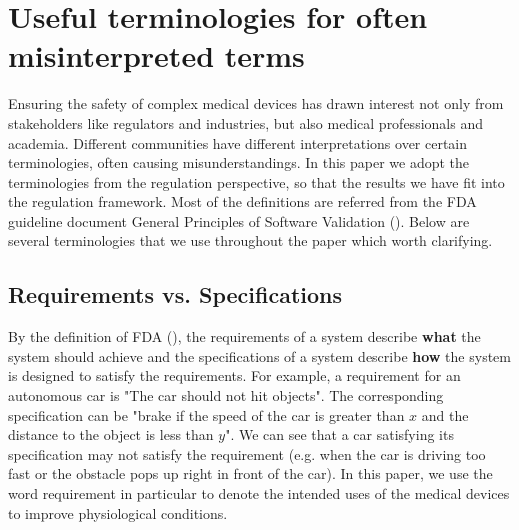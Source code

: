 \vspace{-10pt}
\section{Useful terminologies for often misinterpreted terms}
Ensuring the safety of complex medical devices has drawn interest not only from stakeholders like regulators and industries, but also medical professionals and academia. Different communities have different interpretations over certain terminologies, often causing misunderstandings. In this paper we adopt the terminologies from the regulation perspective, so that the results we have fit into the regulation framework. Most of the definitions are referred from the FDA guideline document General Principles of Software Validation (\cite{fda2}). Below are several terminologies that we use throughout the paper which worth clarifying.
\vspace{-5pt}
\subsection{Requirements vs. Specifications}
By the definition of FDA (\cite{fda3}), the requirements of a system describe \textbf{what} the system should achieve and the specifications of a system describe \textbf{how} the system is designed to satisfy the requirements. For example, a requirement for an autonomous car is "The car should not hit objects". The corresponding specification can be "brake if the speed of the car is greater than $x$ and the distance to the object is less than $y$". We can see that a car satisfying its specification may not satisfy the requirement (e.g. when the car is driving too fast or the obstacle pops up right in front of the car). In this paper, we use the word requirement in particular to denote the intended uses of the medical devices to improve physiological conditions.

